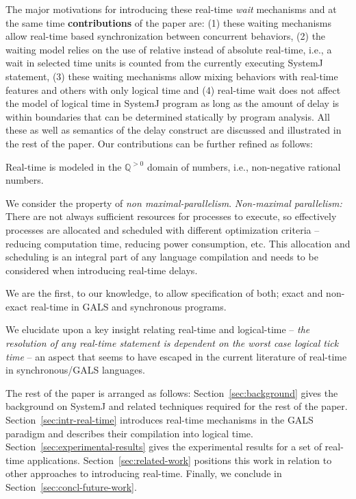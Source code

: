 The major motivations for introducing these real-time \textit{wait}
mechanisms and at the same time \textbf{contributions} of the paper are:
(1) these waiting mechanisms allow real-time based synchronization
between concurrent behaviors, (2) the waiting model relies on the use of
relative instead of absolute real-time, i.e., a wait in selected time
units is counted from the currently executing SystemJ statement, (3)
these waiting mechanisms allow mixing behaviors with real-time features
and others with only logical time and (4) real-time wait does not affect
the model of logical time in SystemJ program as long as the amount of
delay is within boundaries that can be determined statically by program
analysis. All these as well as semantics of the delay construct are
discussed and illustrated in the rest of the paper. Our contributions
can be further refined as follows:
\begin{enumerate*}
\item Real-time is modeled in the $\mathbb{Q}^{>0}$ domain of numbers,
 i.e., non-negative rational numbers.
\item We consider the property of \textit{non
    maximal-parallelism}. \textit{Non-maximal parallelism:} There are
  not always sufficient resources for processes to execute, so
  effectively processes are allocated and scheduled with different
  optimization criteria -- reducing computation time, reducing power
  consumption, etc. This allocation and scheduling is an integral part
  of any language compilation and needs to be considered when
  introducing real-time delays.
\item We are the first, to our knowledge, to allow specification of
  both; exact and non-exact real-time in GALS and synchronous programs.
\item We elucidate upon a key insight relating real-time and
  logical-time -- \textit{the resolution of any real-time statement is
    dependent on the worst case logical tick time} -- an aspect that
  seems to have escaped in the current literature of real-time in
  synchronous/GALS languages.
\end{enumerate*}

The rest of the paper is arranged as follows:
Section~\ref{sec:background} gives the background on SystemJ and related
techniques required for the rest of the
paper. Section~\ref{sec:intr-real-time} introduces real-time mechanisms
in the GALS paradigm and describes their compilation into logical
time. Section~\ref{sec:experimental-results} gives the experimental
results for a set of real-time
applications. Section~\ref{sec:related-work} positions this work in
relation to other approaches to introducing real-time. Finally, we
conclude in Section~\ref{sec:concl-future-work}.


